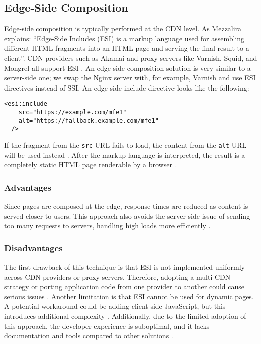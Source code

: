 \subsection{Edge-Side Composition}
\label{subsec:EdgeSide}
Edge-side composition is typically performed at the CDN level. As Mezzalira \cite{MezzaliraBuildingMf} explains: ``Edge-Side Includes (ESI) is a markup language used for assembling different HTML fragments into an HTML page and serving the final result to a client''. CDN providers such as Akamai and proxy servers like Varnish, Squid, and Mongrel all support ESI \cite{Geers}. An edge-side composition solution is very similar to a server-side one; we swap the Nginx server with, for example, Varnish and use ESI directives instead of SSI. An edge-side include directive looks like the following:
\begin{lstlisting}[caption={Example of edge-side composition using ESI}]
  <esi:include 
    src="https://example.com/mfe1" 
    alt="https://fallback.example.com/mfe1" 
  />
\end{lstlisting}
If the fragment from the \texttt{src} URL fails to load, the content from the \texttt{alt} URL will be used instead \cite{Geers}. After the markup language is interpreted, the result is a completely static HTML page renderable by a browser \cite{MezzaliraBuildingMf}.

\subsubsection{Advantages}
Since pages are composed at the edge, response times are reduced as content is served closer to users. This approach also avoids the server-side issue of sending too many requests to servers, handling high loads more efficiently \cite{MezzaliraBuildingMf}.

\subsubsection{Disadvantages}
The first drawback of this technique is that ESI is not implemented uniformly across CDN providers or proxy servers. Therefore, adopting a multi-CDN strategy or porting application code from one provider to another could cause serious issues \cite{Peltonen}. Another limitation is that ESI cannot be used for dynamic pages. A potential workaround could be adding client-side JavaScript, but this introduces additional complexity \cite{MezzaliraBuildingMf}. Additionally, due to the limited adoption of this approach, the developer experience is suboptimal, and it lacks documentation and tools compared to other solutions \cite{MezzaliraBuildingMf}.

